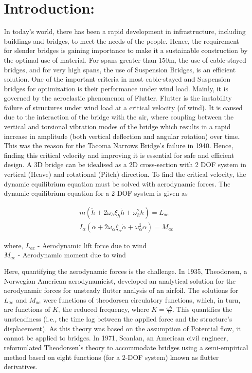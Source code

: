 \documentclass[a4paper, 12pt]{report}
\begin{document}

\section*{Introduction:}

In today's world, there has been a rapid development in infrastructure, including buildings and bridges, to meet the needs of the 
people. Hence, the requirement for slender bridges is gaining importance to make it a sustainable construction by the optimal use 
of material. For spans greater than 150m, the use of cable-stayed bridges, and for very high spans, the use of Suspension Bridges, 
is an efficient solution. One of the important criteria in most cable-stayed and Suspension bridges for optimization is their 
performance under wind load. Mainly, it is governed by the aeroelastic phenomenon of Flutter. Flutter is the instability failure 
of structures under wind load at a critical velocity (of wind). It is caused due to the interaction of the bridge with the air, 
where coupling between the vertical and torsional vibration modes of the bridge which results in a rapid increase in amplitude 
(both vertical deflection and angular rotation) over time. This was the reason for the Tacoma Narrows Bridge's failure in 1940. 
Hence, finding this critical velocity and improving it is essential for safe and efficient design. A 3D bridge can be idealised 
as a 2D cross-section with 2 DOF system in vertical (Heave) and rotational (Pitch) direction. To find the critical velocity, 
the dynamic equilibrium equation must be solved with aerodynamic forces. The dynamic equilibrium equation for a 2-DOF system is 
given as

\begin{align}
m(\ddot{h} + 2\omega_h\xi_h\dot{h} + \omega_h^2 h) = L_{ae} \\
I_\alpha( \ddot{\alpha} + 2\omega_\alpha\xi_\alpha\dot{\alpha} + \omega_\alpha^2 \alpha) = M_{ae}
\end{align}

where, $L_{ae}$ - Aerodynamic lift force due to wind \\
\phantom{where,} $M_{ae}$ - Aerodynamic moment due to wind
\vspace{0.5 cm}

Here, quantifying the aerodynamic forces is the challenge. In 1935, Theodorsen, a Norwegian American aerodynamicist, developed an 
analytical solution for the aerodynamic forces for unsteady flutter analysis of an airfoil. The solutions for $L_{ae}$ and 
$M_{ae}$ were functions of theodorsen circulatory functions, which, in turn, are functions of $K$, the reduced frequency, where 
$K = \frac{\omega b}{U}$. This quantifies the unsteadiness (i.e., the time lag between the applied force and the structure's 
displacement). As this theory was based on the assumption of Potential flow, it cannot be applied to bridges. In 1971, Scanlan, 
an American civil engineer, reformulated Theodorsen's theory to accommodate bridges using a semi-empirical method based on eight 
functions (for a 2-DOF system) known as flutter derivatives.
\end{document}
